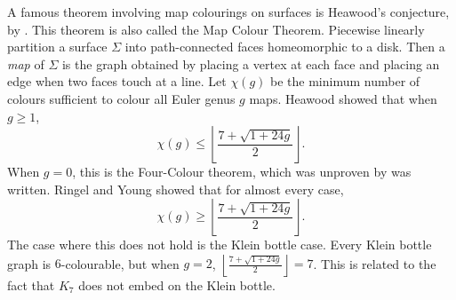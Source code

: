 A famous theorem involving map colourings on surfaces is Heawood's conjecture, by \textcite{heawoodMapcolourTheorem1890}. This theorem is also called the Map Colour Theorem. Piecewise linearly partition a surface $\Sigma$ into path-connected faces homeomorphic to a disk. Then a \textit{map} of $\Sigma$ is the graph obtained by placing a vertex at each face and placing an edge when two faces touch at a line. Let $\chi(g)$ be the minimum number of colours sufficient to colour all Euler genus $g$ maps. Heawood showed that when $g \geq 1$, 
	\begin{equation*}
		\chi(g) \leq \left\lfloor 
		\frac{7 + \sqrt{1 + 24g}}{2}
		\right\rfloor.
	\end{equation*}
When $g = 0$, this is the Four-Colour theorem, which was unproven  by \textcite{ringelMapColorTheorem1974} was written.  
Ringel and Young \cite{ringelMapColorTheorem1974} showed that for almost every case,
\begin{equation*}
	\chi(g) \geq \left\lfloor 
	\frac{7 + \sqrt{1 + 24g}}{2}
	\right\rfloor.
\end{equation*}
The case where this does not hold is the Klein bottle case. Every Klein bottle graph is $6$-colourable, but when $g = 2$, $\left\lfloor 
\frac{7 + \sqrt{1 + 24g}}{2}
\right\rfloor = 7$. This is related to the fact that $K_7$ does not embed on the Klein bottle. 
